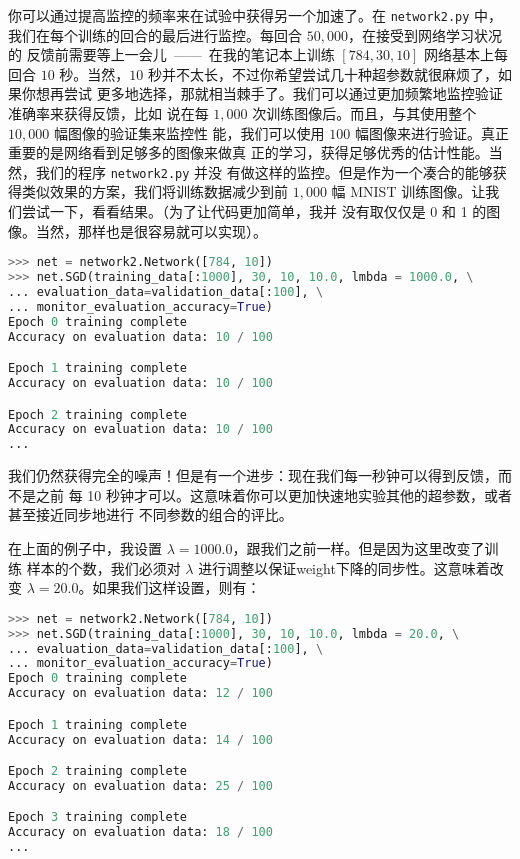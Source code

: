 你可以通过提高监控的频率来在试验中获得另一个加速了。在 \lstinline!network2.py!
中，我们在每个训练的回合的最后进行监控。每回合 $50,000$，在接受到网络学习状况的
反馈前需要等上一会儿~——~在我的笔记本上训练 $[784, 30, 10]$ 网络基本上每回合 $10$
秒。当然，$10$ 秒并不太长，不过你希望尝试几十种超参数就很麻烦了，如果你想再尝试
更多地选择，那就相当棘手了。我们可以通过更加频繁地监控验证准确率来获得反馈，比如
说在每 $1,000$ 次训练图像后。而且，与其使用整个 $10,000$ 幅图像的验证集来监控性
能，我们可以使用 $100$ 幅图像来进行验证。真正重要的是网络看到足够多的图像来做真
正的学习，获得足够优秀的估计性能。当然，我们的程序 \lstinline!network2.py! 并没
有做这样的监控。但是作为一个凑合的能够获得类似效果的方案，我们将训练数据减少到前
$1,000$ 幅 MNIST 训练图像。让我们尝试一下，看看结果。（为了让代码更加简单，我并
  没有取仅仅是 0 和 1 的图像。当然，那样也是很容易就可以实现）。
\begin{lstlisting}[language=Python]
>>> net = network2.Network([784, 10])
>>> net.SGD(training_data[:1000], 30, 10, 10.0, lmbda = 1000.0, \
... evaluation_data=validation_data[:100], \
... monitor_evaluation_accuracy=True)
Epoch 0 training complete
Accuracy on evaluation data: 10 / 100

Epoch 1 training complete
Accuracy on evaluation data: 10 / 100

Epoch 2 training complete
Accuracy on evaluation data: 10 / 100
...
\end{lstlisting}

我们仍然获得完全的噪声！但是有一个进步：现在我们每一秒钟可以得到反馈，而不是之前
每 10 秒钟才可以。这意味着你可以更加快速地实验其他的超参数，或者甚至接近同步地进行
不同参数的组合的评比。

在上面的例子中，我设置 $\lambda=1000.0$，跟我们之前一样。但是因为这里改变了训练
样本的个数，我们必须对 $\lambda$ 进行调整以保证\gls*{weight}下降的同步性。这意味着改变
$\lambda = 20.0$。如果我们这样设置，则有：

\begin{lstlisting}[language=Python]
>>> net = network2.Network([784, 10])
>>> net.SGD(training_data[:1000], 30, 10, 10.0, lmbda = 20.0, \
... evaluation_data=validation_data[:100], \
... monitor_evaluation_accuracy=True)
Epoch 0 training complete
Accuracy on evaluation data: 12 / 100

Epoch 1 training complete
Accuracy on evaluation data: 14 / 100

Epoch 2 training complete
Accuracy on evaluation data: 25 / 100

Epoch 3 training complete
Accuracy on evaluation data: 18 / 100
...
\end{lstlisting}


